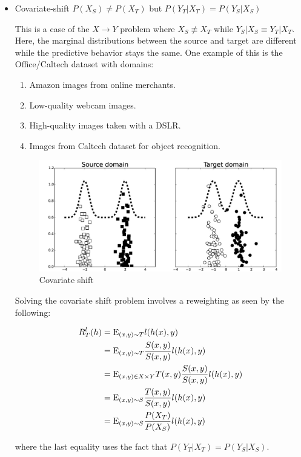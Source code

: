 \begin{itemize}
	\item Covariate-shift
	$P(X_S)\neq P(X_T)$ but $P(Y_T|X_T)= P(Y_S|X_S)$
	
	This is a case of the $X\to Y$ problem where $X_S\not\equiv X_T$ while $Y_S|X_S \equiv Y_T|X_T$. Here, the marginal distributions between the source and target are different while the predictive behavior stays the same. One example of this is the Office/Caltech dataset \cite{Caltech} with domains:
	
	\begin{enumerate}
		\item Amazon images from online merchants.
		\item Low-quality webcam images.
		\item High-quality images taken with a DSLR.
		\item Images from Caltech dataset for object recognition.
	\end{enumerate}
	
	\begin{figure}
		\centering
		\includegraphics[width=0.7\linewidth]{pictures/covariate_shift}
		\caption[Covariate shift illustration.]{Covariate shift}
		\label{fig:covariateshift}
	\end{figure}

	Solving the covariate shift problem involves a reweighting as seen by the following:
	
	\begin{align*}
	R^l_T(h) &= \mathrm{E}_{(x,y)\sim T} l(h(x),y) \\
	&= \mathrm{E}_{(x,y)\sim T} \frac{S(x,y)}{S(x,y)}l(h(x),y) \\
	&= \mathrm{E}_{(x,y)\in X\times Y} T(x,y)\frac{S(x,y)}{S(x,y)}l(h(x),y) \\
	&= \mathrm{E}_{(x,y)\sim S} \frac{T(x,y)}{S(x,y)}l(h(x),y) \\
	&= \mathrm{E}_{(x,y)\sim S} \frac{P(X_T)}{P(X_S)}l(h(x),y)
	\end{align*}
	
	where the last equality uses the fact that $P(Y_T|X_T)=P(Y_S|X_S)$.
	

\end{itemize}
